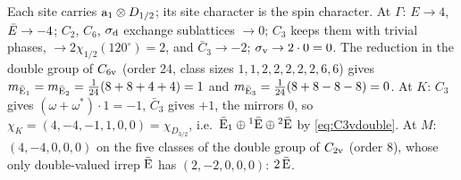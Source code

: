 \begin{solution}
Each site carries $\mathrm{a}_1\otimes D_{1/2}$; its site character is the spin character.
At $\Gamma$: $E\to4$, $\bar{E}\to-4$; $C_2$, $C_6$, $\sigma_{\mathrm{d}}$ exchange sublattices $\to0$; $C_3$
keeps them with trivial phases, $\to2\chi_{1/2}(120^\circ)=2$, and $\bar{C}_3\to-2$;
$\sigma_{\mathrm{v}}\to2\cdot0=0$. The reduction in the double group of $C_{6\mathrm{v}}$ (order 24, class sizes
$1,1,2,2,2,2,2,6,6$) gives
$m_{\bar{\mathrm{E}}_1}=m_{\bar{\mathrm{E}}_2}=\tfrac1{24}(8+8+4+4)=1$ and
$m_{\bar{\mathrm{E}}_3}=\tfrac1{24}(8+8-8-8)=0$.
At $K$: $C_3$ gives $(\omega+\omega^{*})\cdot1=-1$, $\bar{C}_3$ gives $+1$, the mirrors
$0$, so $\chi_K=(4,-4,-1,1,0,0)=\chi_{D_{3/2}}$, i.e.\
$\bar{\mathrm{E}}_1\oplus{}^{1}\bar{\mathrm{E}}\oplus{}^{2}\bar{\mathrm{E}}$ by \eqref{eq:C3vdouble}.
At $M$: $(4,-4,0,0,0)$ on the five classes of the double group of $C_{2\mathrm{v}}$ (order 8),
whose only double-valued irrep $\bar{\mathrm{E}}$ has $(2,-2,0,0,0)$: $2\,\bar{\mathrm{E}}$.
\end{solution}
